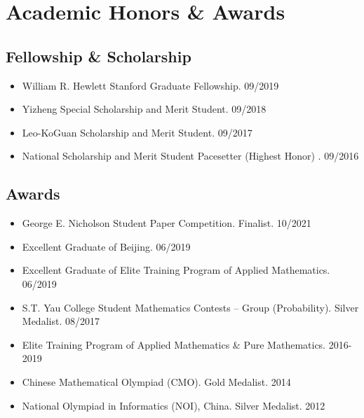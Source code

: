 \documentclass[10pt, a4paper]{article}
\newcommand{\cvdategap}{\hspace{1.5em}\hfill}
\begin{document}

\section*{\textbf{Academic Honors \& Awards}}
\subsection*{\textbf{Fellowship \& Scholarship}}
	\begin{itemize}
		\item[--] William R. Hewlett Stanford Graduate Fellowship. \cvdategap 09/2019
		\item[--] Yizheng Special Scholarship and Merit Student. \cvdategap 09/2018
		\item[--] Leo-KoGuan Scholarship and Merit Student. \cvdategap 09/2017
		\item[--] National Scholarship and Merit Student Pacesetter (Highest Honor) . \cvdategap 09/2016
	\end{itemize}
\subsection*{\textbf{Awards}}
	\begin{itemize}
		\item[--] George E. Nicholson Student Paper Competition. Finalist. \cvdategap 10/2021
		\item[--] Excellent Graduate of Beijing. \cvdategap 06/2019
		\item[--] Excellent Graduate of Elite Training Program of Applied Mathematics. \cvdategap 06/2019
		\item[--] S.T. Yau College Student Mathematics Contests -- Group (Probability). Silver Medalist. \cvdategap 08/2017
		\item[--] Elite Training Program of Applied Mathematics \& Pure Mathematics. \cvdategap 2016-2019
		\item[--] Chinese Mathematical Olympiad (CMO). Gold Medalist. \cvdategap 2014
		\item[--] National Olympiad in Informatics (NOI), China. Silver Medalist. \cvdategap 2012
	\end{itemize}
\end{document}
